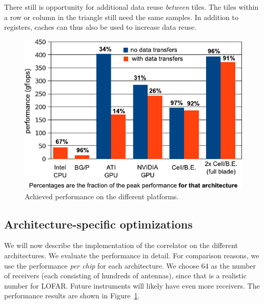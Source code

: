 \documentclass{article}
\begin{document}

There still is
opportunity for additional data reuse \emph{between} tiles.  The tiles
within a row or column in the triangle still need the same samples.
In addition to registers, caches can thus also be used to increase
data reuse. 



\begin{figure}[t]
\begin{center}
\includegraphics[width=\columnwidth]{figures/performance-graph-v2.pdf}
\end{center}
\vspace{-0.5cm}
\caption{Achieved performance on the different platforms.}
\label{performance-graph}
\end{figure}

\subsection{Architecture-specific optimizations}
\label{sec:architecture-optimizations}

We will now describe the implementation of the correlator on
the different architectures. 
We evaluate the performance in detail. For comparison reasons, we use the performance
\emph{per chip} for each architecture.
We choose 64 as the number of receivers (each consisting of hundreds of antennas), since
that is a realistic number for LOFAR.  Future instruments will likely
have even more receivers. The performance results are shown in Figure~\ref{performance-graph}.
\end{document}
